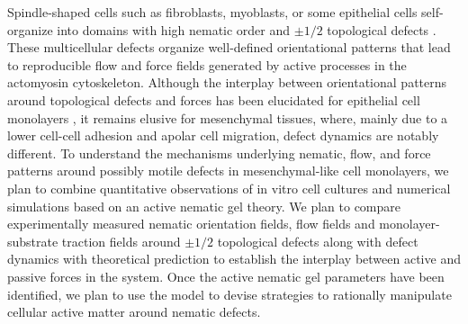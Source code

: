   Spindle-shaped cells such as fibroblasts, myoblasts, or some epithelial cells self-organize into domains with high nematic order and $\pm 1/2$ topological defects  \cite{duclos2017, guillamat2020}. These multicellular defects organize well-defined orientational patterns that lead to reproducible flow and force fields generated by active processes in the actomyosin cytoskeleton. Although the interplay between orientational patterns around topological defects and forces has been elucidated for epithelial cell monolayers \cite{balasubramaniam2021}, it remains elusive for mesenchymal tissues, where, mainly due to a lower cell-cell adhesion and apolar cell migration, defect dynamics are notably different. %
To understand the mechanisms underlying nematic, flow, and force patterns around possibly motile defects in mesenchymal-like cell monolayers, we plan to combine quantitative observations of in vitro cell cultures and numerical simulations based on an active nematic gel theory. We plan to compare experimentally measured nematic orientation fields, flow fields and monolayer-substrate traction fields around $\pm 1/2$ topological defects along with defect dynamics with theoretical prediction to establish the interplay between active and passive forces in the system. Once the active nematic gel parameters have been identified, we plan to use the model to devise strategies to rationally manipulate cellular active matter around nematic defects.
